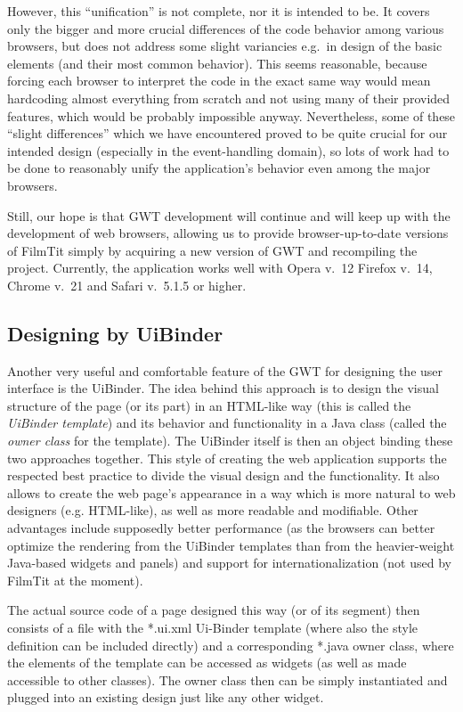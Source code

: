 However, this ``unification'' is not complete, nor it is intended to be. It covers only the bigger and more crucial differences of the code behavior among various browsers, but does not address some slight variancies e.g.\ in design of the basic elements (and their most common behavior). This seems reasonable, because forcing each browser to interpret the code in the exact same way would mean hardcoding almost everything from scratch and not using many of their provided features, which would be probably impossible anyway. Nevertheless, some of these ``slight differences'' which we have encountered proved to be quite crucial for our intended design (especially in the event-handling domain), so lots of work had to be done to reasonably unify the application's behavior even among the major browsers.

Still, our hope is that GWT development will continue and will keep up with the development of web browsers, allowing us to provide browser-up-to-date versions of FilmTit simply by acquiring a new version of GWT and recompiling the project. Currently, the application works well with Opera v.~12
Firefox v.~14, Chrome v.~21 and Safari v.~5.1.5 or higher.


\subsection{Designing by UiBinder}
Another very useful and comfortable feature of the GWT for designing the user interface is the UiBinder. The idea behind this approach is to design the visual structure of the page (or its part) in an HTML-like way (this is called the {\em UiBinder template}) and its behavior and functionality in a Java class (called the {\em owner class} for the template). The UiBinder itself is then an object binding these two approaches together. This style of creating the web application supports the respected best practice to divide the visual design and the functionality. It also allows to create the web page's appearance in a way which is more natural to web designers (e.g. HTML-like), as well as more readable and modifiable. Other advantages include supposedly better performance (as the browsers can better optimize the rendering from the UiBinder templates than from the heavier-weight Java-based widgets and panels) and support for internationalization (not used by FilmTit at the moment).

The actual source code of a page designed this way (or of its segment) then consists of a file with the *.ui.xml Ui-Binder template (where also the style definition can be included directly) and a corresponding *.java owner class, where the elements of the template can be accessed as widgets (as well as made accessible to other classes). The owner class then can be simply instantiated and plugged into an existing design just like any other widget.

